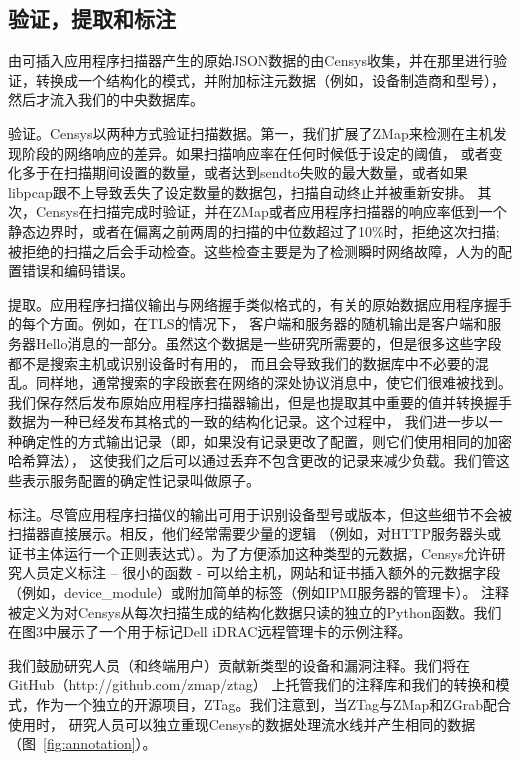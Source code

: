 \subsection{验证，提取和标注}

由可插入应用程序扫描器产生的原始JSON数据的由Censys收集，并在那里进行验证，转换成一个结构化的模式，并附加标注元数据（例如，设备制造商和型号），
然后才流入我们的中央数据库。

{\heiti 验证。}Censys以两种方式验证扫描数据。第一，我们扩展了ZMap来检测在主机发现阶段的网络响应的差异。如果扫描响应率在任何时候低于设定的阈值，
或者变化多于在扫描期间设置的数量，或者达到sendto失败的最大数量，或者如果libpcap跟不上导致丢失了设定数量的数据包，扫描自动终止并被重新安排。
其次，Censys在扫描完成时验证，并在ZMap或者应用程序扫描器的响应率低到一个静态边界时，或者在偏离之前两周的扫描的中位数超过了10\%时，拒绝这次扫描;
 被拒绝的扫描之后会手动检查。这些检查主要是为了检测瞬时网络故障，人为的配置错误和编码错误。

{\heiti 提取。}应用程序扫描仪输出与网络握手类似格式的，有关的原始数据应用程序握手的每个方面。例如，在TLS的情况下，
客户端和服务器的随机输出是客户端和服务器Hello消息的一部分。虽然这个数据是一些研究所需要的，但是很多这些字段都不是搜索主机或识别设备时有用的，
而且会导致我们的数据库中不必要的混乱。同样地，通常搜索的字段嵌套在网络的深处协议消息中，使它们很难被找到。
我们保存然后发布原始应用程序扫描器输出，但是也提取其中重要的值并转换握手数据为一种已经发布其格式的一致的结构化记录。这个过程中，
我们进一步以一种确定性的方式输出记录（即，如果没有记录更改了配置，则它们使用相同的加密哈希算法），
这使我们之后可以通过丢弃不包含更改的记录来减少负载。我们管这些表示服务配置的确定性记录叫做原子。

{\heiti 标注。}尽管应用程序扫描仪的输出可用于识别设备型号或版本，但这些细节不会被扫描器直接展示。相反，他们经常需要少量的逻辑
（例如，对HTTP服务器头或证书主体运行一个正则表达式）。为了方便添加这种类型的元数据，Censys允许研究人员定义标注 – 很小的函数 - 
可以给主机，网站和证书插入额外的元数据字段（例如，device\_module）或附加简单的标签（例如IPMI服务器的管理卡）。
注释被定义为对Censys从每次扫描生成的结构化数据只读的独立的Python函数。我们在图3中展示了一个用于标记Dell iDRAC远程管理卡的示例注释。

我们鼓励研究人员（和终端用户）贡献新类型的设备和漏洞注释。我们将在GitHub（http://github.com/zmap/ztag）
上托管我们的注释库和我们的转换和模式，作为一个独立的开源项目，ZTag。我们注意到，当ZTag与ZMap和ZGrab配合使用时，
研究人员可以独立重现Censys的数据处理流水线并产生相同的数据（图~\ref{fig:annotation}）。

